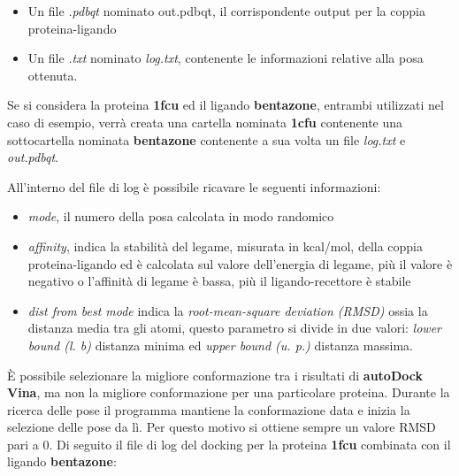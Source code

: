 \begin{itemize}
    \item Un file \textit{.pdbqt} nominato out.pdbqt, il corrispondente output per la coppia proteina-ligando
    \item Un file \textit{.txt} nominato \textit{log.txt}, contenente le informazioni relative alla posa ottenuta. 
\end{itemize}

Se si considera la proteina \textbf{1fcu} ed il ligando \textbf{bentazone}, entrambi utilizzati nel caso di esempio, verrà creata una cartella nominata \textbf{1cfu} contenente una sottocartella nominata \textbf{bentazone} contenente a sua volta un file \textit{log.txt} e \textit{out.pdbqt}.

All'interno del file di log è possibile ricavare le seguenti informazioni:

\begin{itemize}
    \item \textit{mode}, il numero della posa calcolata in modo randomico
    \item \textit{affinity}, indica la stabilità del legame, misurata in kcal/mol, della coppia proteina-ligando ed è calcolata sul valore dell'energia di legame, più il valore è negativo o l'affinità di legame è bassa, più il ligando-recettore è stabile
    \item \textit{dist from best mode} indica la \textit{root-mean-square deviation (RMSD)} ossia la distanza media tra gli atomi, questo parametro si divide in due valori: \textit{lower bound (l. b)} distanza minima ed \textit{upper bound (u. p.)} distanza massima.
\end{itemize}

È possibile selezionare la migliore conformazione tra i risultati di \textbf{autoDock Vina}, ma non la migliore conformazione per una particolare proteina. Durante la ricerca delle pose il programma mantiene la conformazione data e inizia la selezione delle pose da lì. Per questo motivo si ottiene sempre un valore RMSD pari a 0. Di seguito il file di log del docking per la proteina \textbf{1fcu} combinata con il ligando \textbf{bentazone}:

